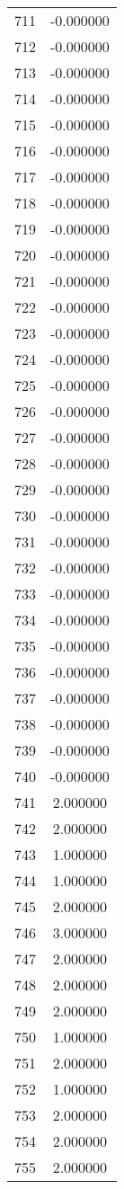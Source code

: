\documentclass[12pt]{article}
\begin{document}
\begin{longtable}{@{}cc@{}}
711 & -0.000000 \\
712 & -0.000000 \\
713 & -0.000000 \\
714 & -0.000000 \\
715 & -0.000000 \\
716 & -0.000000 \\
717 & -0.000000 \\
718 & -0.000000 \\
719 & -0.000000 \\
720 & -0.000000 \\
721 & -0.000000 \\
722 & -0.000000 \\
723 & -0.000000 \\
724 & -0.000000 \\
725 & -0.000000 \\
726 & -0.000000 \\
727 & -0.000000 \\
728 & -0.000000 \\
729 & -0.000000 \\
730 & -0.000000 \\
731 & -0.000000 \\
732 & -0.000000 \\
733 & -0.000000 \\
734 & -0.000000 \\
735 & -0.000000 \\
736 & -0.000000 \\
737 & -0.000000 \\
738 & -0.000000 \\
739 & -0.000000 \\
740 & -0.000000 \\
741 & 2.000000 \\
742 & 2.000000 \\
743 & 1.000000 \\
744 & 1.000000 \\
745 & 2.000000 \\
746 & 3.000000 \\
747 & 2.000000 \\
748 & 2.000000 \\
749 & 2.000000 \\
750 & 1.000000 \\
751 & 2.000000 \\
752 & 1.000000 \\
753 & 2.000000 \\
754 & 2.000000 \\
755 & 2.000000 \\

\end{longtable}
\end{document}
